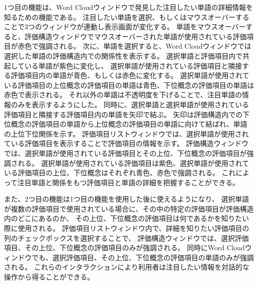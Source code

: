 \documentclass[syuuron]{kuee}
\begin{document}
			1つ目の機能は、Word Cloudウィンドウで発見した注目したい単語の詳細情報を知るための機能である。
			注目したい単語を選択、もしくはマウスオーバーすることで3つのウィンドウが連動し表示画面が変化する。
			単語をマウスオーバーすると、評価構造ウィンドウでマウスオーバーされた単語が使用されている評価項目が赤色で強調される。
			次に、単語を選択すると、Word Cloudウィンドウでは選択した単語の評価構造内での関係性を表示する。
			選択単語と評価項目内で共起している単語が紫色に変化し、
			選択単語が使用されている評価項目と隣接する評価項目内の単語が青色、もしくは赤色に変化する。
			選択単語が使用されている評価項目の上位概念の評価項目の単語は青色、下位概念の評価項目の単語は赤色で表示される。
			それ以外の単語は不透明度を下げることで、注目単語の情報のみを表示するようにした。
			同時に、選択単語と選択単語が使用されている評価項目と隣接する評価項目内の単語を矢印で結ぶ。
			矢印は評価構造内での下位概念の評価項目の単語から上位概念の評価項目の単語に向けて結ばれ、単語の上位下位関係を示す。
			評価項目リストウィンドウでは、選択単語が使用されている評価項目を表示することで評価項目の情報を示す。
			評価構造ウィンドウでは、選択単語が使用されている評価項目とその上位、下位概念の評価項目が強調される。
			選択単語が使用されている評価項目は紫色、選択単語が使用されている評価項目の上位、下位概念はそれぞれ青色、赤色で強調される。
			これによって注目単語と関係をもつ評価項目と単語の詳細を把握することができる。
			
			また、2つ目の機能は1つ目の機能を使用した後に使えるようになり、
			選択単語が複数の評価項目で使用されている場合に、その中の特定の評価項目が評価構造内のどこにあるのか、
			その上位、下位概念の評価項目は何であるかを知りたい際に使用される。
			評価項目リストウィンドウ内で、詳細を知りたい評価項目の列のチェックボックスを選択することで、
			評価構造ウィンドウでは、選択評価項目、その上位、下位概念の評価項目のみが強調される。
			同時にWord Cloudウィンドウでも、選択評価項目、その上位、下位概念の評価項目の単語のみが強調される。
			これらのインタラクションにより利用者は注目したい情報を対話的な操作から得ることができる。
			
\end{document}
